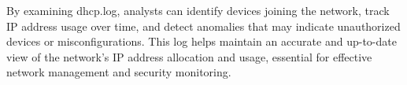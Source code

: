 By examining \colorbox{gray!20}{dhcp.log}, analysts can identify devices joining the network, track IP address usage over time, and detect anomalies that may indicate unauthorized devices or misconfigurations. This log helps maintain an accurate and up-to-date view of the network's IP address allocation and usage, essential for effective network management and security monitoring.

\\
\vspace{1cm}